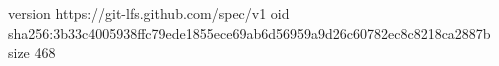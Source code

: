 version https://git-lfs.github.com/spec/v1
oid sha256:3b33c4005938ffc79ede1855ece69ab6d56959a9d26c60782ec8c8218ca2887b
size 468
